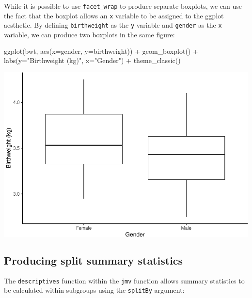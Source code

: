 \documentclass[
]{memoir}
\newenvironment{Shaded}{\begin{snugshade}}{\end{snugshade}}
\newcommand{\AttributeTok}[1]{\textcolor[rgb]{0.77,0.63,0.00}{#1}}
\newcommand{\FunctionTok}[1]{\textcolor[rgb]{0.00,0.00,0.00}{#1}}
\newcommand{\NormalTok}[1]{#1}
\newcommand{\SpecialCharTok}[1]{\textcolor[rgb]{0.00,0.00,0.00}{#1}}
\newcommand{\StringTok}[1]{\textcolor[rgb]{0.31,0.60,0.02}{#1}}
\begin{document}
While it is possible to use \texttt{facet\_wrap} to produce separate boxplots, we can use the fact that the boxplot allows an \texttt{x} variable to be assigned to the ggplot aesthetic. By defining \texttt{birthweight} as the \texttt{y} variable and \texttt{gender} as the \texttt{x} variable, we can produce two boxplots in the same figure:

\begin{Shaded}
\begin{Highlighting}[]
\FunctionTok{ggplot}\NormalTok{(bwt, }\FunctionTok{aes}\NormalTok{(}\AttributeTok{x=}\NormalTok{gender, }\AttributeTok{y=}\NormalTok{birthweight)) }\SpecialCharTok{+}
  \FunctionTok{geom\_boxplot}\NormalTok{() }\SpecialCharTok{+}
  \FunctionTok{labs}\NormalTok{(}\AttributeTok{y=}\StringTok{"Birthweight (kg)"}\NormalTok{, }\AttributeTok{x=}\StringTok{"Gender"}\NormalTok{) }\SpecialCharTok{+}
  \FunctionTok{theme\_classic}\NormalTok{()}
\end{Highlighting}
\end{Shaded}

\includegraphics{05.1-Means-R_files/figure-latex/unnamed-chunk-5-1.pdf}

\hypertarget{producing-split-summary-statistics}{%
\subsection{Producing split summary statistics}\label{producing-split-summary-statistics}}

The \texttt{descriptives} function within the \texttt{jmv} function allows summary statistics to be calculated within subgroups using the \texttt{splitBy} argument:
\end{document}
